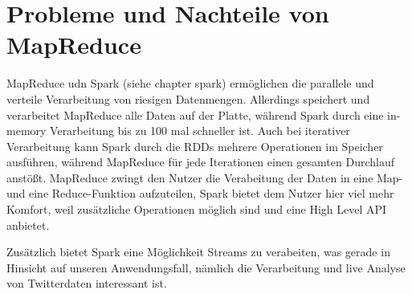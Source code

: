 \section{Probleme und Nachteile von MapReduce}

MapReduce udn Spark (siehe chapter spark) ermöglichen die parallele und verteile Verarbeitung von riesigen Datenmengen.
Allerdings speichert und verarbeitet MapReduce alle Daten auf der Platte, während Spark durch eine in-memory Verarbeitung bis zu 100 mal schneller ist.
Auch bei iterativer Verarbeitung kann Spark durch die RDDs mehrere Operationen im Speicher ausführen, 
während MapReduce für jede Iterationen einen gesamten Durchlauf anstößt.
MapReduce zwingt den Nutzer die Verabeitung der Daten in eine Map- und eine Reduce-Funktion aufzuteilen, Spark bietet dem Nutzer hier viel mehr Komfort, weil zusätzliche Operationen möglich sind und eine High Level API anbietet. 

Zusätzlich bietet Spark eine Möglichkeit Streams zu verabeiten, was gerade in Hinsicht auf unseren Anwendungsfall, nämlich die Verarbeitung und live Analyse von Twitterdaten interessant ist. 

